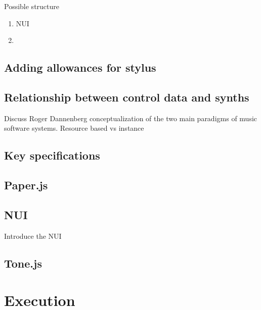 \documentclass[a4paper,12pt]{article}
\begin{document}
Possible structure
\begin{enumerate}
\item NUI
\item 
\end{enumerate}

\subsection{Adding allowances for stylus}
\label{sec:org1bed041}
\subsection{Relationship between control data and synths}
\label{sec:orgc35337e}
Discuss Roger Dannenberg conceptualization of the two main paradigms of music
software systems. Resource based vs instance \cite{dannenberg_resource-instance_1991} 
\subsection{Key specifications}
\label{sec:orgd37cbfb}
\subsection{Paper.js}
\label{sec:org3e1525d}
\subsection{NUI}
\label{sec:orge8158f7}
Introduce the NUI
\subsection{Tone.js}
\label{sec:orgf55cc6e}
\cite{mann_interactive_2015}

\section{Execution}
\label{sec:orgd078fd9}
\end{document}
